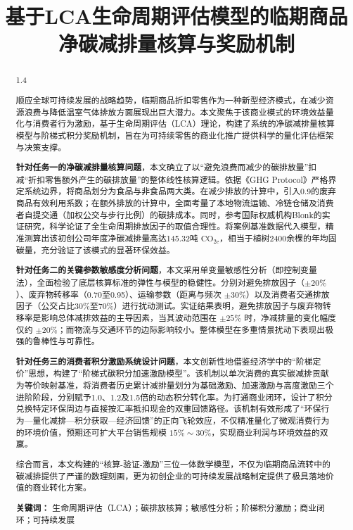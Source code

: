 \documentclass{article}
\begin{document}
\title{基于LCA生命周期评估模型的临期商品净碳减排量核算与奖励机制}
\maketitle

\begin{abstract}
\setlength{\parskip}{0.6em} 
\begin{spacing}{1.4} 

顺应全球可持续发展的战略趋势，临期商品折扣零售作为一种新型经济模式，在减少资源浪费与降低温室气体排放方面展现出巨大潜力。本文聚焦于该商业模式的环境效益量化与消费者行为激励，基于生命周期评估（LCA）理论，构建了系统的净碳减排量核算模型与阶梯式积分奖励机制，旨在为可持续零售的商业化推广提供科学的量化评估框架与决策支撑。

\textbf{针对任务一的净碳减排量核算问题}，本文确立了以“避免浪费而减少的碳排放量”扣减“折扣零售额外产生的碳排放量”的整体线性核算逻辑。依据《GHG Protocol》严格界定系统边界，将商品划分为食品与非食品两大类。在减少排放的计算中，引入0.9的废弃商品有效利用系数；在额外排放的计算中，全面考量了本地物流运输、冷链仓储及消费者自提交通（加权公交与步行比例）的碳排成本。同时，参考国际权威机构Blonk的实证研究，科学论证了全生命周期排放因子的取值合理性。将案例基准数据代入模型，精准测算出该初创公司年度净碳减排量高达145.32吨 $\text{CO}_{2\text{e}}$，相当于植树2400余棵的年均固碳量，充分验证了该模式的显著环保效益。

\textbf{针对任务二的关键参数敏感度分析问题}，本文采用单变量敏感性分析（即控制变量法），全面检验了底层核算标准的弹性与模型的稳健性。分别对避免排放因子（$\pm 20\%$）、废弃物转移率（0.70至0.95）、运输参数（距离与频次 $\pm 30\%$）以及消费者交通排放因子（公交占比30\%至70\%）进行扰动测试。实证结果表明，避免排放因子与废弃物转移率是影响总体减排效益的主导因素，当其波动范围在 $\pm 25\%$ 时，净减排量的变化幅度仅约 $\pm 20\%$；而物流与交通环节的边际影响较小。整体模型在多重情景扰动下表现出极强的鲁棒性与可靠性。

\textbf{针对任务三的消费者积分激励系统设计问题}，本文创新性地借鉴经济学中的“阶梯定价”思想，构建了“阶梯式碳积分加速激励模型”。该机制以单次消费的真实碳减排贡献为等价映射基准，将消费者历史累计减排量划分为基础激励、加速激励与高度激励三个进阶阶段，分别赋予1.0、1.2及1.5倍的动态积分转化率。为打通商业闭环，设计了积分兑换特定环保周边与直接按汇率抵扣现金的双重回馈路径。该机制有效形成了“环保行为—量化减排—积分获取—经济回馈”的正向飞轮效应，不仅精准量化了微观消费行为的环境价值，预期还可扩大平台销售规模 $15\% \sim 30\%$，实现商业利润与环境效益的双赢。

综合而言，本文构建的“核算-验证-激励”三位一体数学模型，不仅为临期商品流转中的碳减排提供了严谨的数理刻画，更为初创企业的可持续发展战略制定提供了极具落地价值的商业转化方案。

\vspace{1em}
\noindent \textbf{关键词：} 生命周期评估（LCA）；碳排放核算；敏感性分析；阶梯积分激励；商业闭环；可持续发展

\end{spacing}
\end{abstract}
\end{document}
